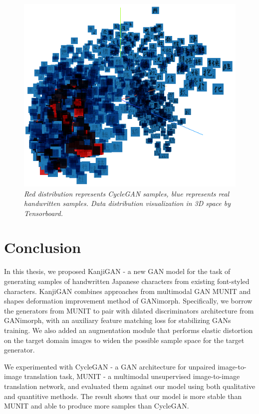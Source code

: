 \documentclass[12pt]{report}
\begin{document}
\begin{figure}[h]
	\centering
	\includegraphics[scale=1]{real-cyclegan}
	\caption{\textit{Red distribution represents CycleGAN samples, blue represents real handwritten samples. Data distribution visualization in 3D space by Tensorboard. }}
	\label{fig:data-distribution-2}
\end{figure}

\chapter{Conclusion}
\label{chap:conclusion}

In this thesis, we proposed KanjiGAN - a new GAN model for the task of generating samples of handwritten Japanese characters from existing font-styled characters. KanjiGAN combines approaches from multimodal GAN MUNIT\cite{munit} and shapes deformation improvement method of GANimorph\cite{ganimorph}. Specifically, we borrow the generators from MUNIT to pair with dilated discriminators architecture from GANimorph, with an auxiliary feature matching loss for stabilizing GANs training. We also added an augmentation module that performs elastic distortion on the target domain images to widen the possible sample space for the target generator.

We experimented with CycleGAN - a GAN architecture for unpaired image-to-image translation task, MUNIT - a multimodal unsupervised image-to-image translation network, and evaluated them against our model using both qualitative and quantitive methods. The result shows that our model is more stable than MUNIT and able to produce more samples than CycleGAN.
\end{document}
